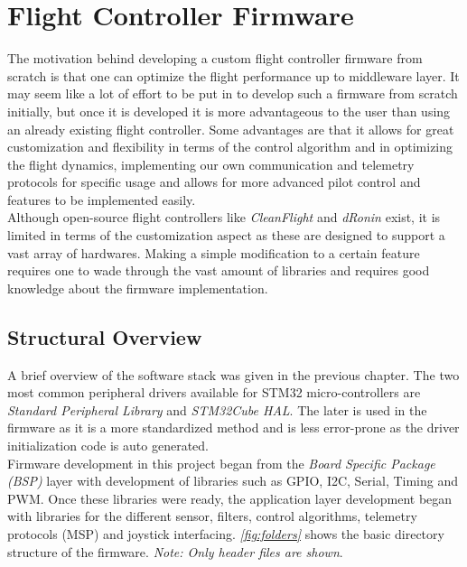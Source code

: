 \documentclass[a4paper,12pt,oneside]{book}
\begin{document}
\chapter[Flight Controller Firmware]{Flight Controller Firmware}
The motivation behind developing a custom flight controller firmware from scratch is that one can optimize the flight performance up to middleware layer. It may seem like a lot of effort to be put in to develop such a firmware from scratch initially, but once it is developed it is more advantageous to the user than using an already existing flight controller. Some advantages are that it allows for great customization and flexibility in terms of the control algorithm and in optimizing the flight dynamics, implementing our own communication and telemetry protocols for specific usage and allows for more advanced pilot control and features to be implemented easily.\\

Although open-source flight controllers like \textit{CleanFlight} and \textit{dRonin} exist, it is limited in terms of the customization aspect as these are designed to support a vast array of hardwares. Making a simple modification to a certain feature requires one to wade through the vast amount of libraries and requires good knowledge about the firmware implementation.\\

\section{Structural Overview}
A brief overview of the software stack was given in the previous chapter. The two most common peripheral drivers available for STM32 micro-controllers are \textit{Standard Peripheral Library} and \textit{STM32Cube HAL}. The later is used in the firmware as it is a  more standardized method and is less error-prone as the driver initialization code is auto generated.\\

Firmware development in this project began from the \textit{Board Specific Package (BSP)} layer with development of libraries such as GPIO, I2C, Serial, Timing and PWM. Once these libraries were ready, the application layer development began with libraries for the different sensor, filters, control algorithms, telemetry protocols (MSP) and joystick interfacing. \textit{\autoref{fig:folders}} shows the basic directory  structure of the firmware. \textit{Note: Only  header files are shown}.\\
\end{document}
